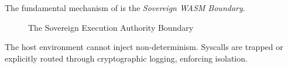 The fundamental mechanism of  is the \textit{Sovereign WASM Boundary}. 

\begin{figure}[h]
\centering
{}
\caption{The Sovereign Execution Authority Boundary}
\end{figure}

The host environment cannot inject non-determinism. Syscalls are trapped or explicitly routed through cryptographic logging, enforcing isolation.
